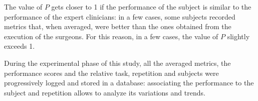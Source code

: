 \documentclass[../main.tex]{subfiles}
\begin{document}
The value of $P$ gets closer to 1 if the performance of the subject is similar to the performance of the expert clinicians: in a few cases, some subjects recorded metrics that, when averaged, were better than the ones obtained from the execution of the surgeons. For this reason, in a few cases, the value of $P$ slightly exceeds 1.

During the experimental phase of this study, all the averaged metrics, the performance scores and the relative task, repetition and subjects were progressively logged and stored in a database: associating the performance to the subject and repetition allows to analyze its variations and trends.

% 
% 
\end{document}
